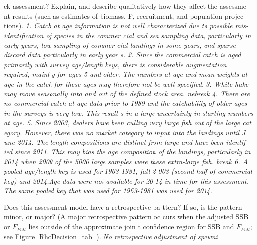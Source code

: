 {\begin{i
temize}{}
ck assessment? Explain, and describe qualitatively how they affect the assessme
nt results (such as estimates of biomass, F, recruitment, and population projec
tions). \linebreak{} \hspace*{0.5cm} \textit{1. Catch at age information is not
 well characterized due to possible mis-identification of species in the commer
cial and sea sampling data, particularly in early years, low sampling of commer
cial landings in some years, and sparse discard data particularly in early year
s. \linebreak{} \hspace*{0.5cm}2. Since the commercial catch is aged primarily 
with survey age/length keys, there is considerable augmentation required, mainl
y for ages 5 and older. The numbers at age and mean weights at age in the catch
 for these ages may therefore not be well specified. \linebreak{} \hspace*{0.5c
m}3. White hake may move seasonally into and out of the defined stock area. \li
nebreak{} \hspace*{0.5cm}4. There are no commercial catch at age data prior to 
1989 and the catchability of older ages in the surveys is very low. This result
s in a large uncertainty in starting numbers at age. \linebreak{} \hspace*{0.5c
m}5. Since 2003, dealers have been culling very large fish out of the large cat
egory. However, there was no market category to input into the landings until J
une 2014. The length compositions are distinct from large and have been identif
ied since 2011. This may bias the age composition of the landings, particularly
 in 2014 when 2000 of the 5000 large samples were these extra-large fish. \line
break{} \hspace*{0.5cm}6. A pooled age/length key is used for 1963-1981, fall 2
003 (second half of commercial key) and 2014.Age data were not available for 20
14 in time for this assessment. The same pooled key that was used for 1963-1981
 was used for 2014.} \item{} Does this assessment model have a retrospective pa
ttern? If so, is the pattern minor, or major? (A major retrospective pattern oc
curs when the adjusted SSB or $F_{Full}${} lies outside of the approximate join
t confidence region for SSB and $F_{Full}${}; see Figure \ref{RhoDecision_tab}{
}). \linebreak{} \hspace*{0.5cm} \textit{ No retrospective adjustment of spawni
}
\end{i
temize}}
